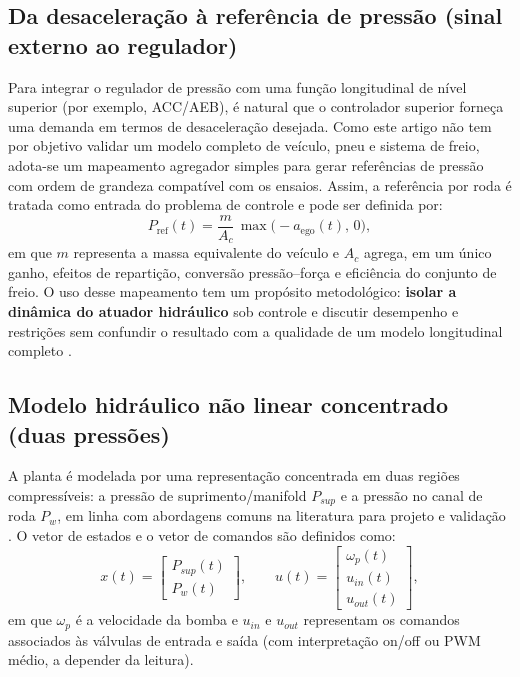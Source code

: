 \documentclass[a4paper]{ifacconf}
\begin{document}
\subsection{Da desaceleração à referência de pressão (sinal externo ao regulador)}
Para integrar o regulador de pressão com uma função longitudinal de nível superior (por exemplo, ACC/AEB), é natural que o controlador superior forneça uma demanda em termos de desaceleração desejada. Como este artigo não tem por objetivo validar um modelo completo de veículo, pneu e sistema de freio, adota-se um mapeamento agregador simples para gerar referências de pressão com ordem de grandeza compatível com os ensaios. Assim, a referência por roda é tratada como entrada do problema de controle e pode ser definida por:
\begin{equation}
   P_{\mathrm{ref}}(t) = \frac{m}{A_c}\,\max\big(-a_{\mathrm{ego}}(t),\,0\big),
   \label{eq:aref_to_pref}
\end{equation}
em que $m$ representa a massa equivalente do veículo e $A_c$ agrega, em um único ganho, efeitos de repartição, conversão pressão--força e eficiência do conjunto de freio. O uso desse mapeamento tem um propósito metodológico: \textbf{isolar a dinâmica do atuador hidráulico} sob controle e discutir desempenho e restrições sem confundir o resultado com a qualidade de um modelo longitudinal completo \cite{Lentin2022}.

\subsection{Modelo hidráulico não linear concentrado (duas pressões)}
A planta é modelada por uma representação concentrada em duas regiões compressíveis: a pressão de suprimento/manifold $P_{sup}$ e a pressão no canal de roda $P_w$, em linha com abordagens comuns na literatura para projeto e validação \cite{HouhuaJing2022,Lv2014,ZengYangHuang2023}. O vetor de estados e o vetor de comandos são definidos como:
\begin{equation}
   x(t)=\begin{bmatrix} P_{sup}(t) \\ P_w(t) \end{bmatrix},
   \qquad
   u(t)=\begin{bmatrix} \omega_p(t) \\ u_{in}(t) \\ u_{out}(t) \end{bmatrix},
   \label{eq:states_inputs}
\end{equation}
em que $\omega_p$ é a velocidade da bomba e $u_{in}$ e $u_{out}$ representam os comandos associados às válvulas de entrada e saída (com interpretação on/off ou PWM médio, a depender da leitura).
\end{document}
